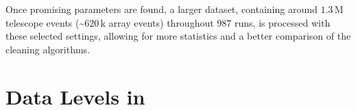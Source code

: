 Once promising parameters are found, a larger dataset, containing around \(\num{1.3}\)\,M telescope events
(\sim\(\num{620}\)\,k array events) throughout \(987\) runs, is processed with these
selected settings, allowing for more statistics and a better comparison of the cleaning algorithms.
\begin{table}
    \centering
    \caption{\texttt{Simtel} data properties of the \gls{corsika} simulation used for the datasets in this work's
    analysis.}
    \label{tab:simtel}
\end{table}


\section{Data Levels in \texorpdfstring{\ctapipe{}}{ctapipe}}
\label{sec:data-levels}

